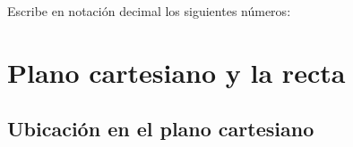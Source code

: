 \documentclass[12pt,addpoints]{evalua}
\begin{document}
\begin{questions}
\begin{multicols}{2}
            \end{multicols}
     
      \question[4] Escribe en notación decimal los siguientes números:
   
      \begin{multicols}{2}
      \end{multicols}

      \newpage
	\section{Plano cartesiano y la recta}

      
	\subsection{Ubicación en el plano cartesiano}


\end{questions}
\end{document}
